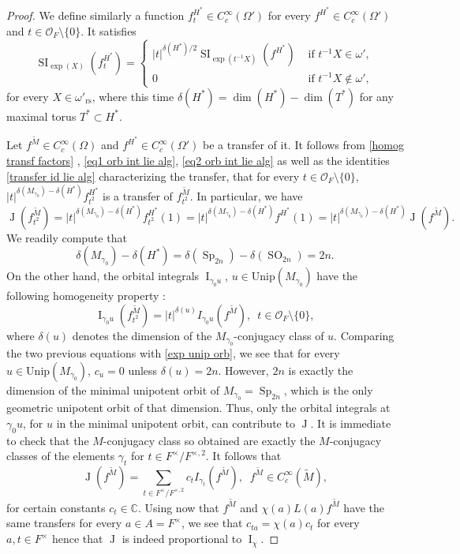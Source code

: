 \documentclass[12pt]{article}
\numberwithin{equation}{section}
\def\tM{\widetilde{M}}
\def\bC{\mathbb{C}}
\DeclareMathOperator{\rs}{rs}
\DeclareMathOperator{\SO}{\mathrm{SO}}
\DeclareMathOperator{\Sp}{\mathrm{Sp}}
\DeclareMathOperator{\SI}{\mathrm{SI}}
\DeclareMathOperator{\rI}{\mathrm{I}}
\DeclareMathOperator{\rJ}{\mathrm{J}}
\begin{document}
\begin{proof}
		We define similarly a function $f^{H^*}_t\in C_c^\infty(\Omega')$ for every $f^{H^*}\in C_c^\infty(\Omega')$ and $t\in \mathcal{O}_F\setminus \{ 0\}$. It satisfies
		\begin{equation}\label{eq2 orb int lie alg}
			\displaystyle \SI_{\exp(X)}(f^{H^*}_t)=\left\{\begin{array}{ll}
				\lvert t\rvert^{\delta(H^*)/2} \SI_{\exp(t^{-1}X)}(f^{H^*}) & \mbox{ if } t^{-1}X\in \omega', \\
				0 & \mbox{ if } t^{-1}X\notin \omega',
			\end{array}
			\right.
		\end{equation}
		for every $X\in \omega'_{\rs}$, where this time $\delta(H^*)=\dim(H^*)-\dim(T^*)$ for any maximal torus $T^*\subset H^*$.
		
		Let $f^{\tM}\in C_c^\infty(\Omega)$ and $f^{H^*}\in C_c^\infty(\Omega')$ be a transfer of it. It follows from \eqref{homog transf factors} , \eqref{eq1 orb int lie alg}, \eqref{eq2 orb int lie alg} as well as the identities \eqref{transfer id lie alg} characterizing the transfer, that for every $t\in \mathcal{O}_F\setminus \{ 0\}$, $\lvert t\rvert^{\delta(M_{\gamma_0})-\delta(H^*)}f^{H^*}_{t^2}$ is a transfer of $f^{\tM}_{t^2}$. In particular, we have
		$$\displaystyle \rJ(f^{\tM}_{t^2})=\lvert t\rvert^{\delta(M_{\gamma_0})-\delta(H^*)}f^{H^*}_{t^2}(1)=\lvert t\rvert^{\delta(M_{\gamma_0})-\delta(H^*)}f^{H^*}(1)=\lvert t\rvert^{\delta(M_{\gamma_0})-\delta(H^*)}\rJ(f^{\tM}).$$
		We readily compute that
		$$\displaystyle \delta(M_{\gamma_0})-\delta(H^*)=\delta(\Sp_{2n})-\delta(\SO_{2n})=2n.$$
		On the other hand, the orbital integrals $\rI_{\gamma_0u}$, $u\in \mathrm{Unip}(M_{\gamma_0})$ have the following homogeneity property \cite[Lemma 3.2]{HCadminv}:
		$$\displaystyle \rI_{\gamma_0 u}(f^{\tM}_{t^2})=\lvert t\rvert^{\delta(u)}I_{\gamma_0 u}(f^{\tM}),\;\ t\in \mathcal{O}_F\setminus \{ 0\},$$
		where $\delta(u)$ denotes the dimension of the $M_{\gamma_0}$-conjugacy class of $u$. Comparing the two previous equations with \eqref{exp unip orb}, we see that for every $u\in \mathrm{Unip}(M_{\gamma_0})$, $c_u=0$ unless $\delta(u)=2n$. However, $2n$ is exactly the dimension of the minimal unipotent orbit of $M_{\gamma_0}=\Sp_{2n}$, which is the only geometric unipotent orbit of that dimension. Thus, only the orbital integrals at $\gamma_0 u$, for $u$ in the minimal unipotent orbit, can contribute to $\rJ$. It is immediate to check that the $M$-conjugacy class so obtained are exactly the $M$-conjugacy classes of the elements $\gamma_t$ for $t\in F^\times/F^{\times,2}$. It follows that
		\begin{equation}\label{roughdecomp I}
			\displaystyle \rJ(f^{\tM})=\sum_{t\in F^\times/F^{\times,2}} c_t I_{\gamma_t}(f^{\tM}),\;\; f^{\tM}\in C_c^\infty(\tM),
		\end{equation}
		for certain constants $c_t\in \bC$. Using now that $f^{\tM}$ and $\chi(a)L(a)f^{\tM}$ have the same transfers for every $a\in A=F^\times$, we see that $c_{ta}=\chi(a)c_t$ for every $a,t\in F^\times$ hence that $\rJ$ is indeed proportional to $\rI_{\chi}$.
		

\end{proof}
\end{document}
